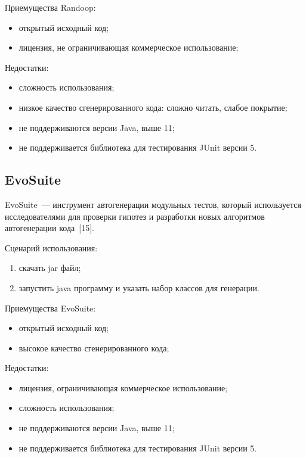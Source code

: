 Приемущества Randoop: 

\begin{itemize}
	\item открытый исходный код;
	\item лицензия, не ограничивающая коммерческое использование;
\end{itemize}

Недостатки:

\begin{itemize}
	\item сложность использования;
	\item низкое качество сгенерированного кода: сложно читать, слабое покрытие;
	\item не поддерживаются версии Java, выше 11;
	\item не поддерживается библиотека для тестирования JUnit версии 5.
\end{itemize}

\subsection{EvoSuite}

EvoSuite~--- инструмент автогенерации модульных тестов, который используется исследователями для проверки 
гипотез и разработки новых алгоритмов автогенерации кода~[15].

Сценарий использования: 

\begin{enumerate}
	\item скачать jar файл;
	\item запустить java программу и указать набор классов для генерации.
\end{enumerate}

Приемущества EvoSuite: 

\begin{itemize}
	\item открытый исходный код;
	\item высокое качество сгенерированного кода;
\end{itemize}

Недостатки:

\begin{itemize}
	\item лицензия, ограничивающая коммерческое использование;
	\item сложность использования;
	\item не поддерживаются версии Java, выше 11;
	\item не поддерживается библиотека для тестирования JUnit версии 5.
\end{itemize}


